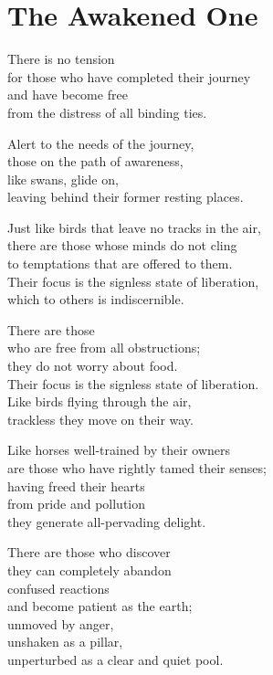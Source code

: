 
\chapter{The Awakened One}


There is no tension\\
for those who have completed their journey\\
and have become free\\
from the distress of all binding ties.


Alert to the needs of the journey,\\
those on the path of awareness,\\
like swans, glide on,\\
leaving behind their former resting places.


Just like birds that leave no tracks in the air,\\
there are those whose minds do not cling\\
to temptations that are offered to them.\\
Their focus is the signless state of liberation,\\
which to others is indiscernible.


There are those\\
who are free from all obstructions;\\
they do not worry about food.\\
Their focus is the signless state of liberation.\\
Like birds flying through the air,\\
trackless they move on their way.


Like horses well-trained by their owners\\
are those who have rightly tamed their senses;\\
having freed their hearts\\
from pride and pollution\\
they generate all-pervading delight.


There are those who discover\\
they can completely abandon\\
confused reactions\\
and become patient as the earth;\\
unmoved by anger,\\
unshaken as a pillar,\\
unperturbed as a clear and quiet pool.


